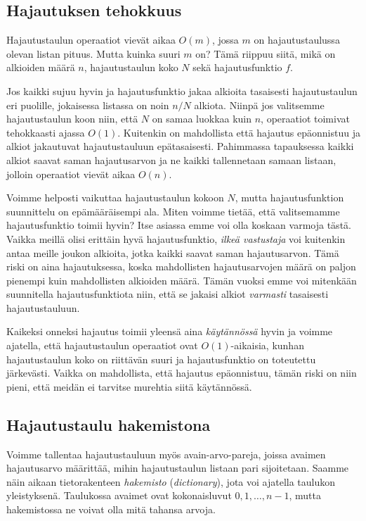 \subsection{Hajautuksen tehokkuus}

Hajautustaulun operaatiot vievät aikaa $O(m)$,
jossa $m$ on hajautustaulussa olevan listan pituus.
Mutta kuinka suuri $m$ on? Tämä riippuu siitä,
mikä on alkioiden määrä $n$, hajautustaulun koko $N$
sekä hajautusfunktio $f$.

Jos kaikki sujuu hyvin ja hajautusfunktio jakaa alkioita
tasaisesti hajautustaulun eri puolille,
jokaisessa listassa on noin $n/N$ alkiota.
Niinpä jos valitsemme hajautustaulun koon niin,
että $N$ on samaa luokkaa kuin $n$,
operaatiot toimivat tehokkaasti ajassa $O(1)$.
Kuitenkin on mahdollista että hajautus epäonnistuu
ja alkiot jakautuvat hajautustauluun epätasaisesti.
Pahimmassa tapauksessa kaikki alkiot saavat saman
hajautusarvon ja ne kaikki tallennetaan samaan listaan,
jolloin operaatiot vievät aikaa $O(n)$.

Voimme helposti vaikuttaa hajautustaulun kokoon $N$,
mutta hajautusfunktion suunnittelu on epämääräisempi ala.
Miten voimme tietää, että valitsemamme hajautusfunktio
toimii hyvin?
Itse asiassa emme voi olla koskaan varmoja tästä.
Vaikka meillä olisi erittäin hyvä hajautusfunktio,
\emph{ilkeä vastustaja} voi kuitenkin antaa
meille joukon alkioita, jotka kaikki saavat saman hajautusarvon.
Tämä riski on aina hajautuksessa, koska mahdollisten
hajautusarvojen määrä on paljon pienempi kuin mahdollisten alkioiden määrä.
Tämän vuoksi emme voi mitenkään suunnitella hajautusfunktiota niin,
että se jakaisi alkiot \emph{varmasti} tasaisesti hajautustauluun.

Kaikeksi onneksi hajautus toimii yleensä aina \emph{käytännössä}
hyvin ja voimme ajatella, että hajautustaulun operaatiot ovat
$O(1)$-aikaisia, kunhan hajautustaulun koko on riittävän suuri ja
hajautusfunktio on toteutettu järke\-västi.
Vaikka on mahdollista, että hajautus epäonnistuu,
tämän riski on niin pieni, että meidän ei tarvitse murehtia
siitä käytännössä.

\subsection{Hajautustaulu hakemistona}


Voimme tallentaa hajautustauluun myös
avain-arvo-pareja, joissa avaimen hajautusarvo määrittää,
mihin hajautustaulun listaan pari sijoitetaan.
Saamme näin aikaan tietorakenteen \emph{hakemisto} (\emph{dictionary}),
jota voi ajatella taulukon yleistyksenä.
Taulukossa avaimet ovat kokonaisluvut $0,1,\dots,n-1$,
mutta hakemistossa ne voivat olla mitä tahansa arvoja.

